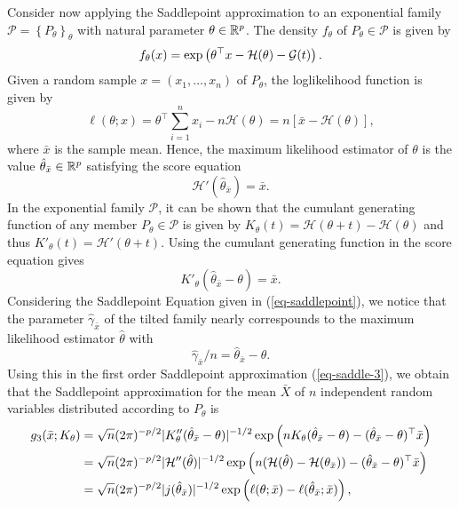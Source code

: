 Consider now applying the Saddlepoint approximation to an exponential family $\mathcal{P} = \left\{P_\theta\right\}_{\theta}$ with natural parameter $\theta \in {\mathbb{R}^p}$. The density $f_\theta$ of $P_\theta \in \mathcal{P}$ is given by
\begin{equation*}
    f_\theta(x) = \exp\left(\theta^\top x - \mathcal{H}(\theta) - \mathcal{G}(t)\right).
\end{equation*}
Given a random sample $x = (x_1, \ldots, x_n)$ of $P_\theta$, the loglikelihood function is given by
\begin{equation*}
    \ell(\theta; x) = \theta^\top \sum_{i=1}^n x_i - n \mathcal{H}(\theta) = n\left[\bar x - \mathcal{H}(\theta)\right],
\end{equation*}
where $\bar x$ is the sample mean. Hence, the maximum likelihood estimator of $\theta$ is the value $\hat\theta_{\bar x} \in {\mathbb{R}^p}$ satisfying the score equation
\begin{equation*}
    \mathcal{H}'(\hat\theta_{\bar x}) = \bar x.
\end{equation*}
In the exponential family $\mathcal{P}$, it can be shown that the cumulant generating function of any member $P_\theta \in \mathcal{P}$ is given by $K_\theta(t) = \mathcal{H}(\theta + t) - \mathcal{H}(\theta)$ and thus $K'_\theta(t) = \mathcal{H}'(\theta + t)$. Using the cumulant generating function in the score equation gives
\begin{equation*}
    K'_\theta(\hat\theta_{\bar x} - \theta) = \bar x.
\end{equation*}
Considering the Saddlepoint Equation given in (\ref{eq-saddlepoint}), we notice that the  parameter $\hat\gamma_{\bar x}$ of the tilted family nearly correspounds to the maximum likelihood estimator $\hat\theta$ with
\begin{equation*}
    \hat\gamma_{\bar x}/n = \hat\theta_{\bar x} - \theta.
\end{equation*}
Using this in the first order Saddlepoint approximation (\ref{eq-saddle-3}), we obtain that the Saddlepoint approximation for the mean $\bar X$ of $n$ independent random variables distributed according to $P_\theta$ is
\begin{align*}
    g_3(\bar x; K_\theta) 
    &= \sqrt{n} (2\pi)^{-p/2}|K_\theta''(\hat\theta_{\bar x} - \theta)|^{-1/2} \exp\left(nK_\theta(\hat\theta_{\bar x} - \theta) - (\hat\theta_{\bar x} - \theta)^\top \bar x\right)\\
    &= \sqrt{n} (2\pi)^{-p/2}|\mathcal{H}''(\hat\theta)|^{-1/2} \exp\left(n(\mathcal{H}(\hat\theta) - \mathcal{H}(\theta_{\bar x})) - (\hat\theta_{\bar x} - \theta)^\top \bar x\right)\\
    &= \sqrt{n} (2\pi)^{-p/2}|j(\hat\theta_{\bar x})|^{-1/2} \exp\left(\ell(\theta; \bar x) - \ell(\hat\theta_{\bar x}; \bar x)\right),
\end{align*}
